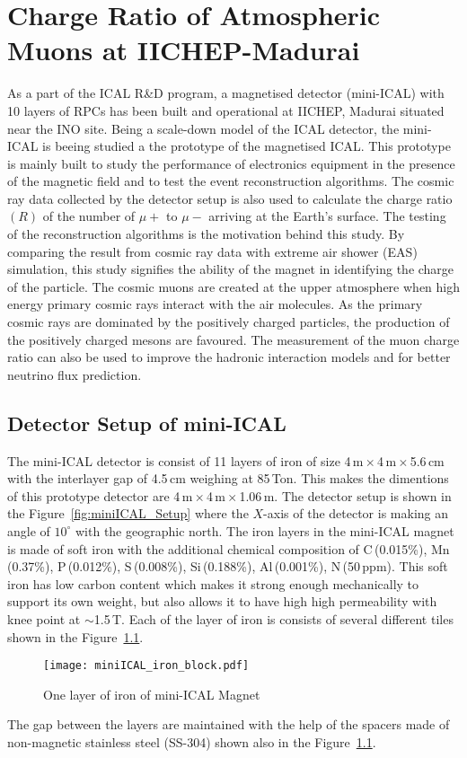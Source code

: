 
\chapter{Charge Ratio of Atmospheric Muons at IICHEP-Madurai}

As a part of the ICAL R\&D program, a magnetised detector (mini-ICAL)
with 10 layers of RPCs has been built and operational at IICHEP,
Madurai situated near the INO site. Being a scale-down model of the
ICAL detector, the mini-ICAL is beeing studied a the prototype of
the magnetised ICAL. This prototype is mainly built to study the
performance of electronics equipment in the presence of the magnetic
field and to test the event reconstruction algorithms.
The cosmic ray data collected by the
detector setup is also used to calculate the charge ratio $(R)$
of the number of $\mu+$ to $\mu-$ arriving at the Earth's surface.
The testing of the reconstruction algorithms is the motivation behind
this study. By comparing the result from cosmic ray data with extreme
air shower (EAS) simulation, this study signifies the ability of
the magnet in identifying the charge of the particle.
The cosmic muons are created at the upper atmosphere when high energy
primary cosmic rays interact with the air molecules.
As the primary cosmic rays are dominated by the positively charged
particles, the production of the positively charged mesons are
favoured. The measurement of the muon charge ratio can also be used
to improve the hadronic interaction models and for better neutrino
flux prediction.

\section{Detector Setup of mini-ICAL}
The mini-ICAL detector is consist of 11 layers of iron of size
4\,m\,$\times$\,4\,m\,$\times$\,5.6\,cm with the interlayer gap
of 4.5\,cm weighing at 85\,Ton. This makes the dimentions of this
prototype detector are 4\,m\,$\times$\,4\,m\,$\times$\,1.06\,m.
The detector setup is shown in the Figure~\ref{fig:miniICAL_Setup}
where the $X$-axis of the detector is making an angle of $10^\circ$
with the geographic north.
The iron layers in the mini-ICAL magnet is made of soft iron with
the additional chemical composition of C\,(0.015\%), Mn\,(0.37\%),
P\,(0.012\%), S\,(0.008\%), Si\,(0.188\%), Al\,(0.001\%), N\,(50\,ppm).
This soft iron has low carbon content which makes it strong enough
mechanically to support its own weight, but also allows it to have high
high permeability with knee point at $\sim$1.5\,T.
Each of the layer of iron is consists of several different tiles shown
in the Figure~\ref{fig:miniICAL_iron}.
\begin{figure}[h]
  \centering
  \texttt{[image: miniICAL\_iron\_block.pdf]} 
  \caption{One layer of iron of mini-ICAL Magnet}
  \label{fig:miniICAL_iron}
\end{figure}
The gap between the layers are maintained with the help of the spacers
made of non-magnetic stainless steel (SS-304) shown also in the
Figure~\ref{fig:miniICAL_iron}.


